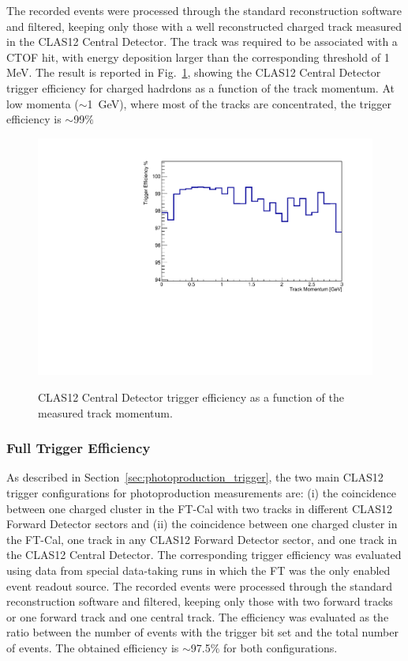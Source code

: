The recorded events were processed through the standard reconstruction software and filtered, keeping only those with a well reconstructed charged track measured in the CLAS12 Central Detector. The track was required to be associated with a CTOF hit, with energy deposition larger than the corresponding threshold of 1 MeV. The result is reported in Fig.~\ref{fig:CD_TrackEfficiency}, showing the CLAS12 Central Detector trigger efficiency for charged hadrdons as a function of the track momentum. At low momenta (${\sim}$1~GeV), where most of the tracks are concentrated, the trigger efficiency is ${\sim}$99$\%$

\begin{figure}[!htb]
 \centering
{\includegraphics[width=.5\textwidth]{img/CD_TrackEfficiency.pdf}}
 \caption{CLAS12 Central Detector trigger efficiency as a function of the measured track momentum.}
 \label{fig:CD_TrackEfficiency}
\end{figure}

\subsubsection{Full Trigger Efficiency}
As described in Section~\ref{sec:photoproduction_trigger}, the two main CLAS12 trigger configurations for photoproduction measurements are: (i) the coincidence between one charged cluster in the FT-Cal with two tracks in different CLAS12 Forward Detector sectors and (ii) the coincidence between one charged cluster in the FT-Cal, one track in any CLAS12 Forward Detector sector, and one track in the CLAS12 Central Detector. The corresponding trigger efficiency was evaluated using data from special data-taking runs in which the FT was the only enabled event readout source. The recorded events were processed through the standard reconstruction software and filtered, keeping only those with two forward tracks or one forward track and one central track. The efficiency was evaluated as the ratio between the number of events with the trigger bit set and the total number of events. The obtained efficiency is $\sim$97.5$\%$ for both configurations. 
